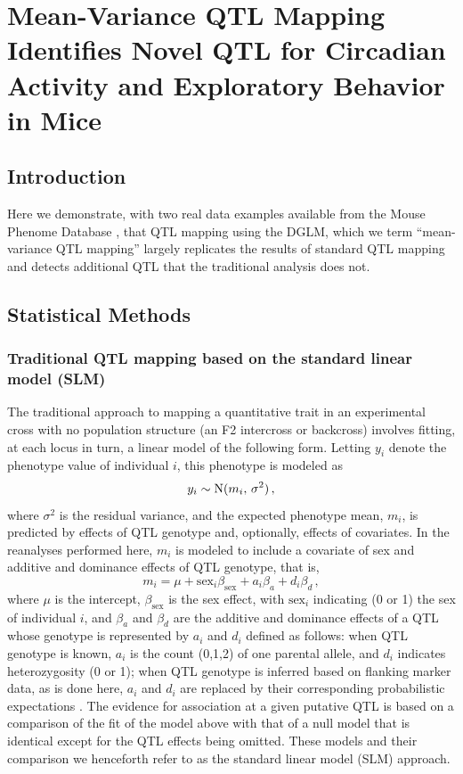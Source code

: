 \chapter{Mean-Variance QTL Mapping Identifies Novel QTL for Circadian Activity and Exploratory Behavior in Mice}
\label{chap:mvqtl_reanalyses}

\section{Introduction}

Here we demonstrate, with two real data examples available from the Mouse Phenome Database \citep{Bogue2015}, that QTL mapping using the DGLM, which we term ``mean-variance QTL mapping'' largely replicates the results of standard QTL mapping and detects additional QTL that the traditional analysis does not.

\section{Statistical Methods}

\subsection{Traditional QTL mapping based on the standard linear model (SLM)}

    The traditional approach to mapping a quantitative trait in an experimental cross with no population structure (\eg an F2 intercross or backcross) involves fitting, at each locus in turn, a linear model of the following form. Letting $y_i$ denote the phenotype value of individual $i$, this phenotype is modeled as
    \[
        y_i \sim \mathrm{N}(m_i,\, \sigma^2)\,,
    \]
    where $\sigma^2$ is the residual variance, and the expected phenotype mean, $m_i$, is predicted by effects of QTL genotype and, optionally, effects of covariates. In the reanalyses performed here, $m_i$ is modeled to include a covariate of sex and additive and dominance effects of QTL genotype, that is,
    \[
        m_i = \mu + \text{sex}_i\beta_\text{sex} + a_i\beta_a + d_i\beta_d\,,
    \]
    where $\mu$ is the intercept, $\beta_\text{sex}$ is the sex effect, with $\text{sex}_i$ indicating (0 or 1) the sex of individual $i$, and $\beta_a$ and $\beta_d$ are the additive and dominance effects of a QTL whose genotype is represented by $a_i$ and $d_i$ defined as follows: when QTL genotype is known, $a_i$ is the count (0,1,2) of one parental allele, and $d_i$ indicates heterozygosity (0 or 1); when QTL genotype is inferred based on flanking marker data, as is done here, $a_i$ and $d_i$ are replaced by their corresponding probabilistic expectations \citep{Haley1992,Martinez1992}. The evidence for association at a given putative QTL is based on a comparison of the fit of the model above with that of a null model that is identical except for the QTL effects being omitted. These models and their comparison we henceforth refer to as the standard linear model (SLM) approach.

